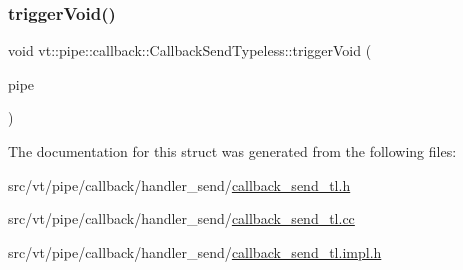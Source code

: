 \subsubsection{\texorpdfstring{trigger\+Void()}{triggerVoid()}}
{\footnotesize\ttfamily void vt\+::pipe\+::callback\+::\+Callback\+Send\+Typeless\+::trigger\+Void (\begin{DoxyParamCaption}\item[{\hyperlink{namespacevt_ac9852acda74d1896f48f406cd72c7bd3}{Pipe\+Type} const \&}]{pipe }\end{DoxyParamCaption})}



The documentation for this struct was generated from the following files\+:\begin{DoxyCompactItemize}
\item 
src/vt/pipe/callback/handler\+\_\+send/\hyperlink{callback__send__tl_8h}{callback\+\_\+send\+\_\+tl.\+h}\item 
src/vt/pipe/callback/handler\+\_\+send/\hyperlink{callback__send__tl_8cc}{callback\+\_\+send\+\_\+tl.\+cc}\item 
src/vt/pipe/callback/handler\+\_\+send/\hyperlink{callback__send__tl_8impl_8h}{callback\+\_\+send\+\_\+tl.\+impl.\+h}\end{DoxyCompactItemize}
